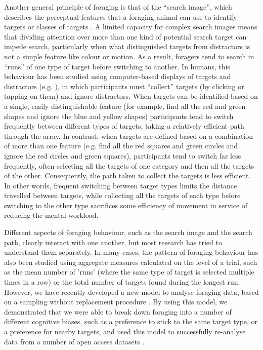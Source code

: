 \documentclass[vision,article,submit,pdftex,moreauthors]{Definitions/mdpi}
\begin{document}
Another general principle of foraging is that of the “search image”, which describes the perceptual features that a foraging animal can use to identify targets or classes of targets \cite{Dukas1993}. A limited capacity for complex search images means that dividing attention over more than one kind of potential search target can impede search, particularly when what distinguished targets from distractors is not a simple feature like colour or motion. As a result, foragers tend to search in “runs” of one type of target before switching to another. In humans, this behaviour has been studied using computer-based displays of targets and distractors (e.g. \citep{ kristjansson2014}), in which participants must “collect” targets (by clicking or tapping on them) and ignore distractors. When targets can be identified based on a single, easily distinguishable feature (for example, find all the red and green shapes and ignore the blue and yellow shapes) participants tend to switch frequently between different types of targets, taking a relatively efficient path through the array. In contrast, when targets are defined based on a combination of more than one feature (e.g. find all the red squares and green circles and ignore the red circles and green squares), participants tend to switch far less frequently, often selecting all the targets of one category and then all the targets of the other. Consequently, the path taken to collect the targets is less efficient. In other words, frequent switching between target types limits the distance travelled between targets, while collecting all the targets of each type before switching to the other type sacrifices some efficiency of movement in service of reducing the mental workload. 

Different aspects of foraging behaviour, such as the search image and the search path, clearly interact with one another, but most research has tried to understand them separately. In many cases, the pattern of foraging behaviour has also been studied using aggregate measures calculated on the level of a trial, such as the mean number of 'runs' (where the same type of target is selected multiple times in a row) or the total number of targets found during the longest run. However, we have recently developed a new model to analyse foraging data, based on a sampling without replacement procedure \cite{clarke2022}. By using this model, we demonstrated that we were able to break down foraging into a number of different cognitive biases, such as a preference to stick to the same target type, or a preference for nearby targets, and used this model to successfully re-analyse data from a number of open access datasets \cite{kristjansson2014, thornton2020, clarke2022, tagu2020}. 
\end{document}
